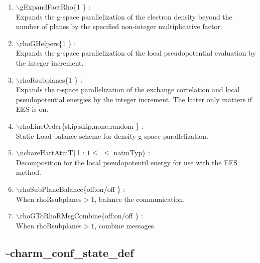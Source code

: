 \documentclass[12pt]{article}
\begin{document}
\begin{enumerate}
  \vspace{0.15in} 
  \item $\backslash$gExpandFactRho\{1 \} : \\    
  Expands the g-space parallelization of the electron density beyond
  the number of planes by the specified non-integer multiplicative factor. 
  \vspace{0.15in} 
  \item $\backslash$rhoGHelpers\{1 \} : \\    
  Expands the g-space parallelization of the local pseudopotential
  evaluation by the integer increment.
  \vspace{0.15in} 
  \item $\backslash$rhoRsubplanes\{1 \} : \\    
  Expands the r-space parallelization of the exchange correlation and 
  local pseudopotential energies by the integer increment. 
  The latter only matters if EES is on.
  \vspace{0.15in} 
  \item $\backslash$rhoLineOrder\{skip:skip,none,random \} : \\    
  Static Load balance scheme for density g-space parallelization.
  \vspace{0.15in} 
  \item $\backslash$nchareHartAtmT\{1 : $1 \leq$ $\leq$ natmTyp\} : \\ 
  Decomposition for the local pseudopotentil energy for use with the 
  EES method.
  \vspace{0.15in} 
  \item $\backslash$rhoSubPlaneBalance\{off:on/off \} : \\    
  When rhoRsubplanes$>1$, balance the communication.
  \vspace{0.15in} 
  \item $\backslash$rhoGToRhoRMsgCombine\{off:on/off \} : \\    
  When rhoRsubplanes$>1$, combine messages.
\end{enumerate}

\newpage
\subsection*{\bf \~{ }charm\_conf\_state\_def}
\end{document}
